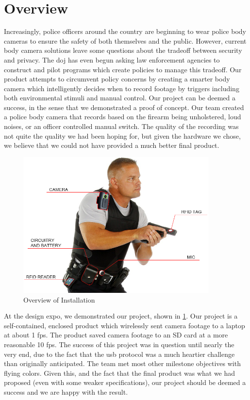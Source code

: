 \documentclass[12pt]{article}
\begin{document}
\section{Overview}
Increasingly, police officers around the country are beginning to wear police
body cameras to ensure the safety of both themselves and the public. However,
current body camera solutions leave some questions about the tradeoff between
security and privacy. The \gls{doj} has even begun asking law enforcement
agencies to construct and pilot programs which create policies to manage this
tradeoff\cite{officer_privacy}. Our product attempts to circumvent policy
concerns by creating a smarter body camera which intelligently decides when to
record footage by triggers including both environmental stimuli and manual
control.  Our project can be deemed a success, in the sense that we
demonstrated a proof of concept. Our team created a police body camera that
records based on the firearm being unholstered, loud noises, or an officer
controlled manual switch.  The quality of the recording was not quite the
quality we had been hoping for, but given the hardware we chose, we believe
that we could not have provided a much better final product. 

\begin{figure}[h]
    \centering
    \includegraphics[width=0.9\textwidth]{installation}
    \caption{Overview of Installation}
    \label{fig:installation}
\end{figure}

At the design expo, we demonstrated our project, shown in
\ref{fig:installation}.  Our project is a self-contained, enclosed product
which wirelessly sent camera footage to a laptop at about 1 \gls{fps}. The
product saved camera footage to an SD card at a more reasonable 10 \gls{fps}.
The success of this project was in question until nearly the very end, due to
the fact that the \gls{usb} protocol was a much heartier challenge than
originally anticipated. The team met most other milestone objectives with
flying colors. Given this, and the fact that the final product was what we had
proposed (even with some weaker specifications), our project should be deemed a
success and we are happy with the result.
\end{document}

